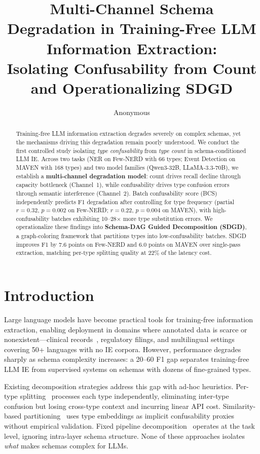 \documentclass[11pt,a4paper]{article}
\title{Multi-Channel Schema Degradation in Training-Free LLM Information Extraction:\\Isolating Confusability from Count and Operationalizing SDGD}
\author{Anonymous}
\begin{document}
\maketitle

\begin{abstract}
Training-free LLM information extraction degrades severely on complex schemas, yet the mechanisms driving this degradation remain poorly understood.
We conduct the first controlled study isolating \emph{type confusability} from \emph{type count} in schema-conditioned LLM IE.
Across two tasks (NER on Few-NERD with 66 types; Event Detection on MAVEN with 168 types) and two model families (Qwen3-32B, LLaMA-3.3-70B), we establish a \textbf{multi-channel degradation model}: count drives recall decline through capacity bottleneck (Channel~1), while confusability drives type confusion errors through semantic interference (Channel~2).
Batch confusability score (BCS) independently predicts F1 degradation after controlling for type frequency (partial $r{=}0.32$, $p{=}0.002$ on Few-NERD; $r{=}0.22$, $p{=}0.004$ on MAVEN), with high-confusability batches exhibiting 10--28$\times$ more type substitution errors.
We operationalize these findings into \textbf{Schema-DAG Guided Decomposition (SDGD)}, a graph-coloring framework that partitions types into low-confusability batches.
SDGD improves F1 by 7.6 points on Few-NERD and 6.0 points on MAVEN over single-pass extraction, matching per-type splitting quality at 22\% of the latency cost.
\end{abstract}

\section{Introduction}
\label{sec:intro}

Large language models have become practical tools for training-free information extraction, enabling deployment in domains where annotated data is scarce or nonexistent---clinical records~\cite{}, regulatory filings, and multilingual settings covering 50+ languages with no IE corpora.
However, performance degrades sharply as schema complexity increases: a 20--60 F1 gap separates training-free LLM IE from supervised systems on schemas with dozens of fine-grained types.

Existing decomposition strategies address this gap with ad-hoc heuristics.
Per-type splitting~\cite{} processes each type independently, eliminating inter-type confusion but losing cross-type context and incurring linear API cost.
Similarity-based partitioning~\cite{} uses type embeddings as implicit confusability proxies without empirical validation.
Fixed pipeline decomposition~\cite{} operates at the task level, ignoring intra-layer schema structure.
None of these approaches isolates \emph{what} makes schemas complex for LLMs.
\end{document}
